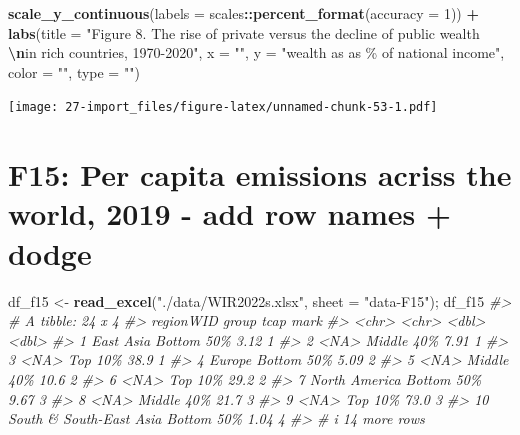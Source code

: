 \documentclass[
  xelatex, ja=standard]{bxjsbook}
\newenvironment{Shaded}{\begin{snugshade}}{\end{snugshade}}
\newcommand{\AttributeTok}[1]{\textcolor[rgb]{0.13,0.29,0.53}{#1}}
\newcommand{\CommentTok}[1]{\textcolor[rgb]{0.56,0.35,0.01}{\textit{#1}}}
\newcommand{\DecValTok}[1]{\textcolor[rgb]{0.00,0.00,0.81}{#1}}
\newcommand{\FunctionTok}[1]{\textcolor[rgb]{0.13,0.29,0.53}{\textbf{#1}}}
\newcommand{\NormalTok}[1]{#1}
\newcommand{\OtherTok}[1]{\textcolor[rgb]{0.56,0.35,0.01}{#1}}
\newcommand{\SpecialCharTok}[1]{\textcolor[rgb]{0.81,0.36,0.00}{\textbf{#1}}}
\newcommand{\StringTok}[1]{\textcolor[rgb]{0.31,0.60,0.02}{#1}}
\theoremstyle{definition}
\theoremstyle{definition}
\theoremstyle{definition}
\theoremstyle{definition}
\theoremstyle{remark}
\begin{document}
\begin{Shaded}
\begin{Highlighting}[]
  \FunctionTok{scale\_y\_continuous}\NormalTok{(}\AttributeTok{labels =}\NormalTok{ scales}\SpecialCharTok{::}\FunctionTok{percent\_format}\NormalTok{(}\AttributeTok{accuracy =} \DecValTok{1}\NormalTok{)) }\SpecialCharTok{+}
  \FunctionTok{labs}\NormalTok{(}\AttributeTok{title =} \StringTok{"Figure 8. The rise of private versus the decline of public wealth }
\StringTok{       }\SpecialCharTok{\textbackslash{}n}\StringTok{in rich countries, 1970{-}2020"}\NormalTok{, }
       \AttributeTok{x =} \StringTok{""}\NormalTok{, }\AttributeTok{y =} \StringTok{"wealth as as \% of national income"}\NormalTok{, }\AttributeTok{color =} \StringTok{""}\NormalTok{, }\AttributeTok{type =} \StringTok{""}\NormalTok{)}
\end{Highlighting}
\end{Shaded}

\texttt{[image: 27-import\_files/figure-latex/unnamed-chunk-53-1.pdf]}

\hypertarget{f15-per-capita-emissions-acriss-the-world-2019---add-row-names-dodge}{%
\section{F15: Per capita emissions acriss the world, 2019 - add row names + dodge}\label{f15-per-capita-emissions-acriss-the-world-2019---add-row-names-dodge}}

\begin{Shaded}
\begin{Highlighting}[]
\NormalTok{df\_f15 }\OtherTok{\textless{}{-}} \FunctionTok{read\_excel}\NormalTok{(}\StringTok{"./data/WIR2022s.xlsx"}\NormalTok{, }\AttributeTok{sheet =} \StringTok{"data{-}F15"}\NormalTok{); df\_f15}
\CommentTok{\#\textgreater{} \# A tibble: 24 x 4}
\CommentTok{\#\textgreater{}    regionWID               group       tcap  mark}
\CommentTok{\#\textgreater{}    \textless{}chr\textgreater{}                   \textless{}chr\textgreater{}      \textless{}dbl\textgreater{} \textless{}dbl\textgreater{}}
\CommentTok{\#\textgreater{}  1 East Asia               Bottom 50\%  3.12     1}
\CommentTok{\#\textgreater{}  2 \textless{}NA\textgreater{}                    Middle 40\%  7.91     1}
\CommentTok{\#\textgreater{}  3 \textless{}NA\textgreater{}                    Top 10\%    38.9      1}
\CommentTok{\#\textgreater{}  4 Europe                  Bottom 50\%  5.09     2}
\CommentTok{\#\textgreater{}  5 \textless{}NA\textgreater{}                    Middle 40\% 10.6      2}
\CommentTok{\#\textgreater{}  6 \textless{}NA\textgreater{}                    Top 10\%    29.2      2}
\CommentTok{\#\textgreater{}  7 North America           Bottom 50\%  9.67     3}
\CommentTok{\#\textgreater{}  8 \textless{}NA\textgreater{}                    Middle 40\% 21.7      3}
\CommentTok{\#\textgreater{}  9 \textless{}NA\textgreater{}                    Top 10\%    73.0      3}
\CommentTok{\#\textgreater{} 10 South \& South{-}East Asia Bottom 50\%  1.04     4}
\CommentTok{\#\textgreater{} \# i 14 more rows}
\end{Highlighting}
\end{Shaded}
\end{document}
